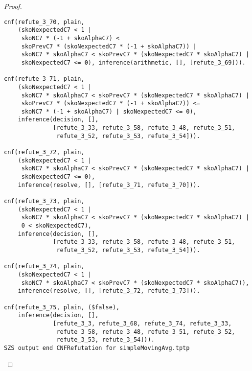 \begin{proof}
\begin{verbatim}
cnf(refute_3_70, plain,
    (skoNexpectedC7 < 1 |
     skoNC7 * (-1 + skoAlphaC7) <
     skoPrevC7 * (skoNexpectedC7 * (-1 + skoAlphaC7)) |
     skoNC7 * skoAlphaC7 < skoPrevC7 * (skoNexpectedC7 * skoAlphaC7) |
     skoNexpectedC7 <= 0), inference(arithmetic, [], [refute_3_69])).

cnf(refute_3_71, plain,
    (skoNexpectedC7 < 1 |
     skoNC7 * skoAlphaC7 < skoPrevC7 * (skoNexpectedC7 * skoAlphaC7) |
     skoPrevC7 * (skoNexpectedC7 * (-1 + skoAlphaC7)) <=
     skoNC7 * (-1 + skoAlphaC7) | skoNexpectedC7 <= 0),
    inference(decision, [],
              [refute_3_33, refute_3_58, refute_3_48, refute_3_51,
               refute_3_52, refute_3_53, refute_3_54])).

cnf(refute_3_72, plain,
    (skoNexpectedC7 < 1 |
     skoNC7 * skoAlphaC7 < skoPrevC7 * (skoNexpectedC7 * skoAlphaC7) |
     skoNexpectedC7 <= 0),
    inference(resolve, [], [refute_3_71, refute_3_70])).

cnf(refute_3_73, plain,
    (skoNexpectedC7 < 1 |
     skoNC7 * skoAlphaC7 < skoPrevC7 * (skoNexpectedC7 * skoAlphaC7) |
     0 < skoNexpectedC7),
    inference(decision, [],
              [refute_3_33, refute_3_58, refute_3_48, refute_3_51,
               refute_3_52, refute_3_53, refute_3_54])).

cnf(refute_3_74, plain,
    (skoNexpectedC7 < 1 |
     skoNC7 * skoAlphaC7 < skoPrevC7 * (skoNexpectedC7 * skoAlphaC7)),
    inference(resolve, [], [refute_3_72, refute_3_73])).

cnf(refute_3_75, plain, ($false),
    inference(decision, [],
              [refute_3_3, refute_3_68, refute_3_74, refute_3_33,
               refute_3_58, refute_3_48, refute_3_51, refute_3_52,
               refute_3_53, refute_3_54])).
SZS output end CNFRefutation for simpleMovingAvg.tptp
\end{verbatim}
  \fi

\end{proof}

